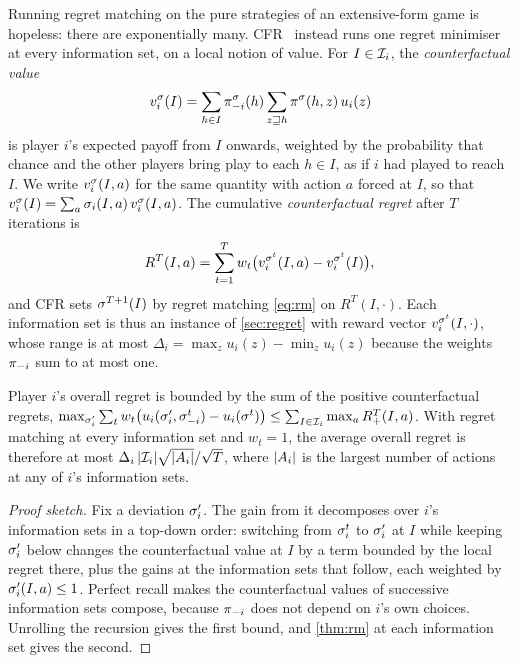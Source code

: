 Running regret matching on the pure strategies of an extensive-form game is hopeless: there are exponentially many.
CFR~\cite{zinkevich2007} instead runs one regret minimiser at every information set, on a local notion of value. For
$I \in \mathcal{I}_i$, the \emph{counterfactual value}
\begin{equation}\label{eq:cfv}
  v_i^\sigma(I) = \sum_{h \in I} \pi^\sigma_{-i}(h) \sum_{z \sqsupseteq h} \pi^\sigma(h,z)\, u_i(z)
\end{equation}
is player $i$'s expected payoff from $I$ onwards, weighted by the probability that chance and the other players bring
play to each $h \in I$, as if $i$ had played to reach $I$. We write $v_i^\sigma(I,a)$ for the same quantity with
action $a$ forced at $I$, so that $v_i^\sigma(I) = \sum_a \sigma_i(I,a)\,v_i^\sigma(I,a)$. The cumulative
\emph{counterfactual regret} after $T$ iterations is
\begin{equation}\label{eq:cfr-regret}
  R^T(I,a) = \sum_{t=1}^T w_t \big( v_i^{\sigma^t}(I,a) - v_i^{\sigma^t}(I) \big),
\end{equation}
and CFR sets $\sigma^{T+1}(I)$ by regret matching \eqref{eq:rm} on $R^T(I,\cdot)$. Each information set is thus an
instance of \cref{sec:regret} with reward vector $v_i^{\sigma^t}(I,\cdot)$, whose range is at most $\Delta_i =
\max_z u_i(z) - \min_z u_i(z)$ because the weights $\pi_{-i}$ sum to at most one.

\begin{theorem}\label{thm:cfr}
Player $i$'s overall regret is bounded by the sum of the positive counterfactual regrets,
$\max_{\sigma_i'} \sum_t w_t\big(u_i(\sigma_i',\sigma^t_{-i}) - u_i(\sigma^t)\big) \le \sum_{I \in \mathcal{I}_i}
\max_a R^T_+(I,a)$. With regret matching at every information set and $w_t = 1$, the average overall regret is
therefore at most $\Delta_i\, |\mathcal{I}_i| \sqrt{|A_i|} / \sqrt T$, where $|A_i|$ is the largest number of actions at
any of $i$'s information sets.
\end{theorem}

\begin{proof}[Proof sketch]
Fix a deviation $\sigma_i'$. The gain from it decomposes over $i$'s information sets in a top-down order: switching
from $\sigma_i^t$ to $\sigma_i'$ at $I$ while keeping $\sigma_i'$ below changes the counterfactual value at $I$ by a
term bounded by the local regret there, plus the gains at the information sets that follow, each weighted by
$\sigma_i'(I,a) \le 1$. Perfect recall makes the counterfactual values of successive information sets compose,
because $\pi_{-i}$ does not depend on $i$'s own choices. Unrolling the recursion gives the first bound, and
\cref{thm:rm} at each information set gives the second.
\end{proof}


